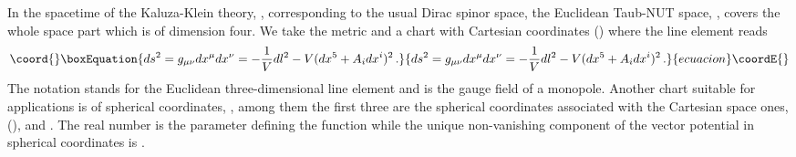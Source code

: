 \documentclass[a4paper,12pt]{article}
\begin{document}
In the spacetime of the Kaluza-Klein theory, \coordHE{}, corresponding to the 
usual Dirac spinor space, the Euclidean Taub-NUT space, \coordHE{}, covers the 
whole space part which is of dimension four. We take the metric 
\coordHE{} and a 
chart with Cartesian coordinates \coordHE{}  (\coordHE{}) where the 
line element reads 
\begin{equation}\coord{}\boxEquation{\label{(met)} 
ds^{2}=g_{\mu\nu}dx^{\mu}dx^{\nu}=-\frac{1}{V}dl^{2}-V(dx^{5}+
A_{i}dx^{i})^{2}\,.
}{ds^{2}=g_{\mu\nu}dx^{\mu}dx^{\nu}=-\frac{1}{V}dl^{2}-V(dx^{5}+
A_{i}dx^{i})^{2}\,.
}{ecuacion}\coordE{}\end{equation}   
The notation \coordHE{} stands for the  Euclidean 
three-di\-men\-sio\-nal line element and \coordHE{} is the gauge field of a 
monopole. Another chart suitable for applications is 
of spherical coordinates, \coordHE{}, among them 
the first three are the  spherical coordinates associated with 
the  Cartesian space ones, \coordHE{}  (\coordHE{}), and 
\coordHE{}. The real number \myHighlight{$\mu$}\coordHE{} is the  parameter  
defining the function \coordHE{} while the unique non-vanishing 
component of the vector potential in spherical coordinates is 
\coordHE{}. 
\end{document}
